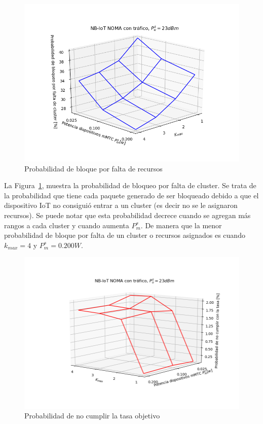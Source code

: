 \begin{figure}[th]
    \centering
    \includegraphics[scale=0.8]{Figures/ResultadosTrafico/Figure_1.png}
    \decoRule
    \caption[Probabilidad de bloque por falta de recursos]{Probabilidad de bloque por falta de recursos}
    \label{fig:bloqueocluster}
\end{figure}

La Figura~\ref{fig:bloqueocluster}, muestra la probabilidad de bloqueo por falta de cluster. Se trata de la probabilidad que tiene cada paquete generado de ser bloqueado debido a que el dispositivo IoT no consiguió entrar a un cluster (es decir no se le asignaron recursos). Se puede notar que esta probabilidad decrece cuando se agregan más rangos a cada cluster y cuando aumenta $P_{m}^{s}$. De manera que la menor probabilidad de bloque por falta de un cluster o recursos asignados es cuando $k_{max}=4$ y $P_{m}^{s}=0.200 W$. \newline

\break

\begin{figure}[th]
    \centering
    \includegraphics[scale=0.8]{Figures/ResultadosTrafico/Figure_3.png}
    \decoRule
    \caption[Probabilidad de no cumplir la tasa objetivo]{Probabilidad de no cumplir la tasa objetivo}
    \label{fig:tasa}
\end{figure}

